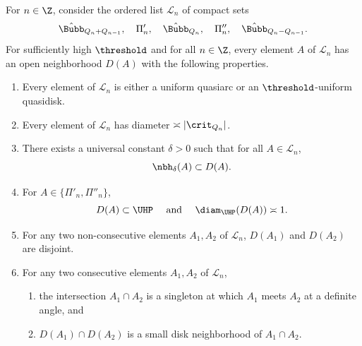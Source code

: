 \documentclass{amsart}
\begin{document}
\begin{lemma}
\label{lem:disjointness-arcs}
    For $n \in \Z$, consider the ordered list $\mathcal{L}_n$ of compact sets
    \[
        \hat{\Bubb}_{Q_n+Q_{n-1}}, \quad 
        \Pi'_n, \quad 
        \hat{\Bubb}_{Q_n}, \quad
        \Pi''_n, \quad 
        \hat{\Bubb}_{Q_n-Q_{n-1}}. 
    \]
    For sufficiently high $\threshold$ and for all $n \in \Z$, every element $A$ of $\mathcal{L}_n$ has an open neighborhood $D(A)$ with the following properties.
    \begin{enumerate}
        \item Every element of $\mathcal{L}_n$ is either a uniform quasiarc or an $\threshold$-uniform quasidisk.
        \item Every element of $\mathcal{L}_n$ has diameter $\asymp |\crit_{Q_n}|$.
        \item There exists a universal constant $\delta>0$ such that for all $A \in \mathcal{L}_n$,
        \[
        \nbh_{\delta}(A) \subset D(A).
        \]
        \item For $A \in \{ \Pi'_n, \Pi''_n \}$,
        \[
            D(A) \subset \UHP \quad \text{ and } \quad
            \diam_{\UHP}(D(A)) \asymp 1.
        \]
        \item For any two non-consecutive elements $A_1, A_2$ of $\mathcal{L}_n$, $D(A_1)$ and $D(A_2)$ are disjoint.
        \item For any two consecutive elements $A_1, A_2$ of $\mathcal{L}_n$,
        \begin{enumerate}[label=\textnormal{(\roman*)}]
            \item the intersection $A_1 \cap A_2$ is a singleton at which $A_1$ meets $A_2$ at a definite angle, and
            \item $D(A_1) \cap D(A_2)$ is a small disk neighborhood of $A_1 \cap A_2$.
        \end{enumerate}
    \end{enumerate}
\end{lemma}
\end{document}
